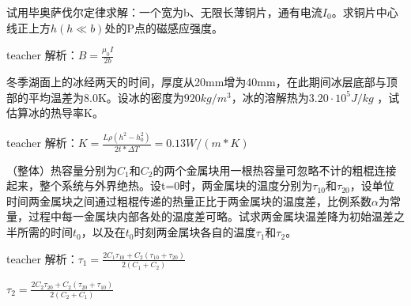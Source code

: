 \begin{example}
	试用毕奥萨伐尔定律求解：一个宽为b、无限长薄铜片，通有电流$I_0$。求铜片中心线正上方$h(h\ll b)$处的P点的磁感应强度。
\begin{taggedblock}{teacher}
解析：$B=\frac{\mu_0 I}{2b}$
\end{taggedblock}
\end{example}

\begin{example}
	冬季湖面上的冰经两天的时间，厚度从20mm增为40mm，在此期间冰层底部与顶部的平均温差为8.0K。设冰的密度为$920kg/m^3$，冰的溶解热为$3.20\cdot10^5J/kg$ ，试估算冰的热导率K。
\begin{taggedblock}{teacher}
解析：$K=\frac{L\rho (h^2-h_0^2)}{2t*\Delta T}=0.13W/(m*K)$
\end{taggedblock}
\end{example}

\begin{example}
	（整体）热容量分别为$C_1$和$C_2$的两个金属块用一根热容量可忽略不计的粗棍连接起来，整个系统与外界绝热。设t=0时，两金属块的温度分别为$\tau_{10}$和$\tau_{20}$，设单位时间两金属块之间通过粗棍传递的热量正比于两金属块的温度差，比例系数$\alpha$为常量，过程中每一金属块内部各处的温度差可略。试求两金属块温差降为初始温差之半所需的时间$t_0$，以及在$t_0$时刻两金属块各自的温度$\tau_1$和$\tau_2$。
\begin{taggedblock}{teacher}
解析：$\tau_1=\frac{2C_1\tau_{10}+C_2(\tau_{10}+\tau_{20})}{2(C_1+C_2)}$

$\tau_2=\frac{2C_2\tau_{20}+C_2(\tau_{20}+\tau_{10})}{2(C_2+C_1)}$
\end{taggedblock}
\end{example}




